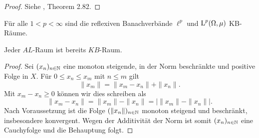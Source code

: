 \begin{proof}
Siehe \cite{banasiak_arlotti_2006}, Theorem 2.82.
\end{proof}

\begin{bsp}
Für alle $1<p<\infty$ sind die reflexiven Banachverbände $\ell^p$ und $\textnormal{L}^p(\Omega,\mu)$ %
KB-Räume.
\end{bsp}


\begin{satz}\label{Jeder $AL$-Raum ist ein $KB$-Raum}
Jeder $AL$-Raum ist bereits $KB$-Raum. 
\end{satz}

\begin{proof}
Sei $(x_n)_{n\in\mathbb{N}}$ eine monoton steigende, in der Norm beschränkte und positive Folge in $X$. Für  $0\leq x_n\leq x_m$ mit $n\leq m$ gilt
\begin{equation*}
\|x_m\| = \|x_m - x_n\| + \|x_n\|.
\end{equation*}
Mit $x_m-x_n\geq0$ können wir dies schreiben als
\begin{equation*}
\|x_m - x_n\| = \|x_m \| - \|x_n\| = \big|\|x_m\| - \|x_n\| \big |.    
\end{equation*}
Nach Voraussetzung ist die Folge $(\|x_n \|)_{n\in\mathbb{N}}$ monoton steigend und beschränkt, insbesondere konvergent. Wegen der Additivität der Norm ist somit $(x_n)_{n\in\mathbb{N}}$ eine Cauchyfolge und die Behauptung folgt.
\end{proof}



